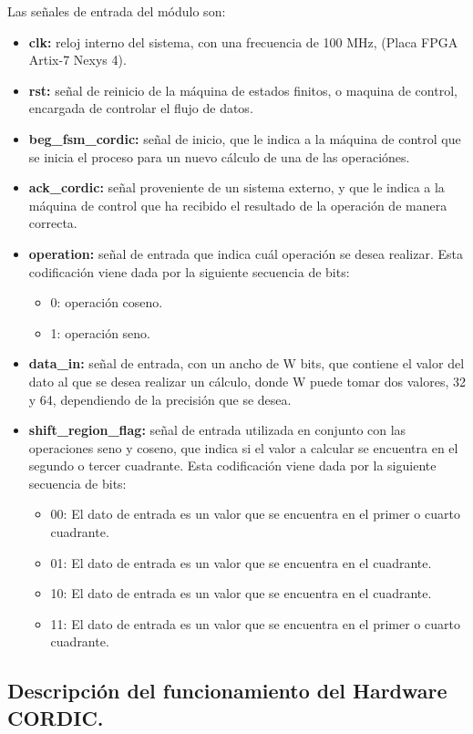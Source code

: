 Las señales de entrada del módulo son:

\begin{itemize}
\item	\textbf{clk:} reloj interno del sistema, con una frecuencia de 100 MHz, (Placa FPGA Artix-7 Nexys 4).
\item	\textbf{rst:} señal de reinicio de la máquina de estados finitos, o maquina de control, encargada de controlar el flujo de datos.
\item	\textbf{beg\_fsm\_cordic:} señal de inicio, que le indica a la máquina de control que se inicia el proceso para un nuevo cálculo de una de las operaciónes.
\item	\textbf{ack\_cordic:} señal proveniente de un sistema externo, y que le indica a la máquina de control que ha recibido el resultado de la operación de manera correcta.
\item	\textbf{operation:} señal de entrada que indica cuál operación se desea realizar. Esta codificación viene dada por la siguiente secuencia de bits:
\begin{itemize}
 \item	0: operación coseno.
 \item	1: operación seno.
\end{itemize}
\item	\textbf{data\_in:} señal de entrada, con un ancho de W bits, que contiene el valor del dato al que se desea realizar un cálculo, donde W puede tomar dos valores, 32 y 64, dependiendo de la precisión que se desea.
\item	\textbf{shift\_region\_flag:} señal de entrada utilizada en conjunto con las operaciones seno y coseno, que indica si el valor a calcular se encuentra en el segundo o tercer cuadrante. Esta codificación viene dada por la siguiente secuencia de bits:
\begin{itemize}
\item	00: El dato de entrada es un valor que se encuentra en el primer o cuarto cuadrante.
\item	01: El dato de entrada es un valor que se encuentra en el cuadrante.
\item	10: El dato de entrada es un valor que se encuentra en el cuadrante.
\item	11: El dato de entrada es un valor que se encuentra en el primer o cuarto cuadrante.
\end{itemize}
\end{itemize}


\subsection{Descripción del funcionamiento del Hardware CORDIC.}


